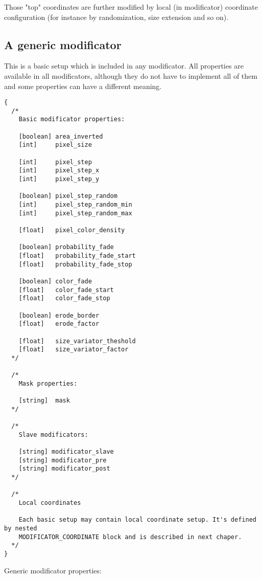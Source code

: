 \documentclass[9pt]{article}
\begin{document}
Those "top" coordinates are further modified by local (in modificator) 
coordinate configuration (for instance by randomization, size extension
and so on).

\subsection{A generic modificator}

This is a basic setup which is included in any modificator.
All properties are available in all modificators, 
although they do not have to implement all of them 
and some properties can have a different meaning.
\begin{verbatim}
{
  /*
    Basic modificator properties:
  
    [boolean] area_inverted
    [int]     pixel_size
    
    [int]     pixel_step
    [int]     pixel_step_x
    [int]     pixel_step_y
  
    [boolean] pixel_step_random
    [int]     pixel_step_random_min
    [int]     pixel_step_random_max
    
    [float]   pixel_color_density
    
    [boolean] probability_fade
    [float]   probability_fade_start
    [float]   probability_fade_stop
  
    [boolean] color_fade
    [float]   color_fade_start
    [float]   color_fade_stop
      
    [boolean] erode_border
    [float]   erode_factor
    
    [float]   size_variator_theshold
    [float]   size_variator_factor
  */    
    
  /*
    Mask properties:
    
    [string]  mask
  */
    
  /*
    Slave modificators:
  
    [string] modificator_slave
    [string] modificator_pre
    [string] modificator_post
  */  

  /*
    Local coordinates
    
    Each basic setup may contain local coordinate setup. It's defined by nested 
    MODIFICATOR_COORDINATE block and is described in next chaper.
  */
}
\end{verbatim}
Generic modificator properties:
\end{document}
